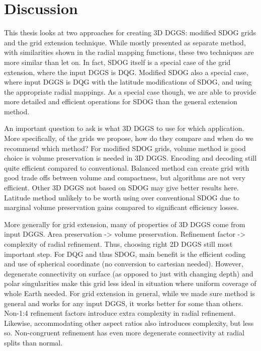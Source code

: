 \chapter{Discussion} \label{chap:discussion}
This thesis looks at two approaches for creating 3D DGGS: modified SDOG grids and the grid extension technique.
While mostly presented as separate method, with similarities shown in the radial mapping functions, these two techniques are more similar than let on.
In fact, SDOG itself is a special case of the grid extension, where the input DGGS is DQG.
Modified SDOG also a special case, where input DGGS is DQG with the latitude modifications of SDOG, and using the appropriate radial mappings.
As a special case though, we are able to provide more detailed and efficient operations for SDOG than the general extension method.


An important question to ask is what 3D DGGS to use for which application.
More specifically, of the grids we propose, how do they compare and when do we recommend which method?
For modified SDOG grids, volume method is good choice is volume preservation is needed in 3D DGGS.
Encoding and decoding still quite efficient compared to conventional.
Balanced method can create grid with good trade offs between volume and compactness, but algorithms are not very efficient.
Other 3D DGGS not based on SDOG may give better results here.
Latitude method unlikely to be worth using over conventional SDOG due to marginal volume preservation gains compared to significant efficiency losses.


More generally for grid extension, many of properties of 3D DGGS come from input DGGS.
Area preservation -> volume preservation. Refinement factor -> complexity of radial refinement.
Thus, choosing right 2D DGGS still most important step.
For DQG and thus SDOG, main benefit is the efficient coding and use of spherical coordinate (no conversion to cartesian needed).
However, degenerate connectivity on surface (as opposed to just with changing depth) and polar singularities make this grid less ideal in situation where uniform coverage of whole Earth needed.
For grid extension in general, while we made sure method is general and works for any input DGGS, it works better for some than others.
Non-1:4 refinement factors introduce extra complexity in radial refinement.
Likewise, accommodating other aspect ratios also introduces complexity, but less so.
Non-congruent refinement has even more degenerate connectivity at radial splits than normal.



